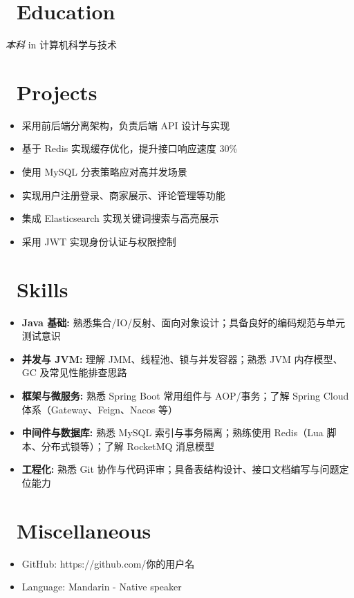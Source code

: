 \documentclass{resume}
\begin{document}



\section{\faGraduationCap\ Education}
\textit{本科} in 计算机科学与技术

\section{\faUsers\ Projects}

\begin{itemize}
  \item 采用前后端分离架构，负责后端 API 设计与实现
  \item 基于 Redis 实现缓存优化，提升接口响应速度 30\%
  \item 使用 MySQL 分表策略应对高并发场景
\end{itemize}

\begin{itemize}
  \item 实现用户注册登录、商家展示、评论管理等功能
  \item 集成 Elasticsearch 实现关键词搜索与高亮展示
  \item 采用 JWT 实现身份认证与权限控制
\end{itemize}

\section{\faCogs\ Skills}
\begin{itemize}[parsep=0.5ex]
  \item \textbf{Java 基础:} 熟悉集合/IO/反射、面向对象设计；具备良好的编码规范与单元测试意识
  \item \textbf{并发与 JVM:} 理解 JMM、线程池、锁与并发容器；熟悉 JVM 内存模型、GC 及常见性能排查思路
  \item \textbf{框架与微服务:} 熟悉 Spring Boot 常用组件与 AOP/事务；了解 Spring Cloud 体系（Gateway、Feign、Nacos 等）
  \item \textbf{中间件与数据库:} 熟悉 MySQL 索引与事务隔离；熟练使用 Redis（Lua 脚本、分布式锁等）；了解 RocketMQ 消息模型
  \item \textbf{工程化:} 熟悉 Git 协作与代码评审；具备表结构设计、接口文档编写与问题定位能力
\end{itemize}

\section{\faInfo\ Miscellaneous}
\begin{itemize}[parsep=0.5ex]
  \item GitHub: https://github.com/你的用户名
  \item Language: Mandarin - Native speaker
\end{itemize}
\end{document}

